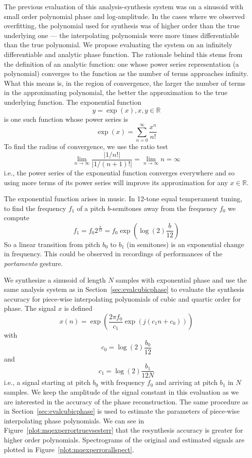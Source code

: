 The previous evaluation of this analysis-synthesis system was on a sinusoid with
small order polynomial phase and log-amplitude. In the cases where we observed overfitting, the
polynomial used for synthesis was of higher order than the true underlying one
--- the interpolating polynomials were more times differentiable than the true
polynomial. We propose evaluating the system on an infinitely differentiable and
analytic phase function. The rationale behind this stems from the definition of
an analytic function: one whose power series representation (a polynomial)
converges to the function as the number of terms approaches infinity. What this
means is, in the region of convergence, the larger the number of terms in the
approximating polynomial, the better the approximation to the true underlying
function. The exponential function
\[
    y=\exp(x), x,y \in \mathbb{R}
\]
is one such function whose power series is
\[
    \exp(x)=\sum_{n=0}^{\infty} \frac{x^{n}}{n!}
\]
To find the radius of convergence, we use the ratio test
\[
    \lim_{n \rightarrow \infty} \frac{|1/n!|}{|1/(n+1)!|} = \lim_{n \rightarrow \infty} n = \infty
\]
i.e., the power series of the exponential function converges everywhere and so
using more terms of its power series will improve its approximation for
any $x \in \mathbb{R}$.

The exponential function arises in music. In 12-tone equal temperament tuning,
to find the frequency $f_{1}$ of a pitch $b$-semitones away from the frequency
$f_{0}$ we compute
\[
    f_{1}=f_{0}2^{\frac{b}{12}}=f_{0}\exp(\log(2)\frac{b}{12})
\]
So a linear transition from pitch $b_{0}$ to $b_{1}$ (in semitones) is an
exponential change in frequency. This could be observed in recordings of
performances of the \textit{portamento} gesture.

We synthesize a sinusoid  of length $N$ samples with exponential phase and use
the same analysis system as in Section~\ref{sec:evalcubicphase} to evaluate the
synthesis accuracy for piece-wise interpolating polynomials of cubic and quartic
order for phase. The signal $x$ is defined
\[
    x(n) = \exp(\frac{2\pi f_{0}}{c_{1}}\exp(j(c_{1}n + c_{0})))
\]
with
\[
    c_{0} = \log(2)\frac{b_{0}}{12}
\]
and
\[
    c_{1}= \log(2)\frac{b_{1}}{12N}
\]
i.e., a signal starting at pitch $b_{0}$ with frequency $f_{0}$ and arriving at
pitch $b_{1}$ in $N$ samples. We keep the amplitude of the signal constant in
this evaluation as we are interested in the accuracy of the phase
reconstruction. The same procedure as in
Section~\ref{sec:evalcubicphase} is used to estimate the parameters of
piece-wise interpolating phase polynomials. We can see in
Figure~\ref{plot:mqexperrortruevsesterr} that the resynthesis accuracy is
greater for higher order polynomials. Spectrograms of the original and estimated
signals are plotted in Figure~\ref{plot:mqexperrorallspect}.

